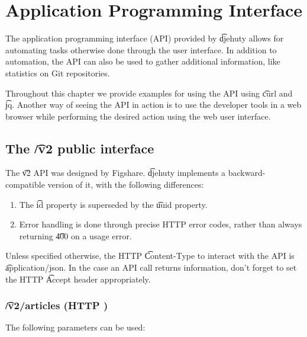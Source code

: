 \chapter{Application Programming Interface}

  The application programming interface (API) provided by \t{djehuty} allows
  for automating tasks otherwise done through the user interface.  In addition
  to automation, the API can also be used to gather additional information,
  like statistics on Git repositories.

  Throughout this chapter we provide examples for using the API using \t{curl} and \t{jq}.
  Another way of seeing the API in action is to use the developer tools in a web
  browser while performing the desired action using the web user interface.

\section{The \t{/v2} public interface}

  The \t{v2} API was designed by Figshare.
  \t{djehuty} implements a backward-compatible version of it, with the
  following differences:
  \begin{enumerate}
    \item{The \t{id} property is superseded by the \t{uuid} property.}
    \item{Error handling is done through precise HTTP error codes,
        rather than always returning \t{400} on a usage error.}
  \end{enumerate}

  Unless specified otherwise, the HTTP \t{Content-Type} to interact
  with the API is \t{application/json}.  In the case an API call returns
  information, don't forget to set the HTTP \t{Accept} header appropriately.

\subsection{\t{/v2/articles} (HTTP )}
\label{sec:v2-articles}

  The following parameters can be used:

